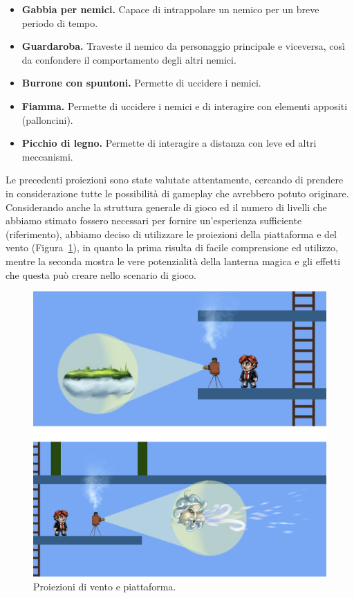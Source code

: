 \begin{itemize}
	\item \textbf{Gabbia per nemici.} Capace di intrappolare un nemico per un breve periodo di tempo.
	
	\item \textbf{Guardaroba.} Traveste il nemico da personaggio principale e viceversa, così da confondere il comportamento degli altri nemici.
	
	\item \textbf{Burrone con spuntoni.} Permette di uccidere i nemici.
	
	\item \textbf{Fiamma.} Permette di uccidere i nemici e di interagire con elementi appositi (palloncini).
	
	\item \textbf{Picchio di legno.} Permette di interagire a distanza con leve ed altri meccanismi.
\end{itemize}

Le precedenti proiezioni sono state valutate attentamente, cercando di prendere in considerazione tutte le possibilità di gameplay che avrebbero potuto originare.
Considerando anche la struttura generale di gioco ed il numero di livelli che abbiamo stimato fossero necessari per fornire un’esperienza sufficiente (riferimento), abbiamo deciso di utilizzare le proiezioni della piattaforma e del vento (Figura~\ref{fig:meccaniche_precinema_piattaforma_vento}), in quanto la prima risulta di facile comprensione ed utilizzo, mentre la seconda mostra le vere potenzialità della lanterna magica e gli effetti che questa può creare nello scenario di gioco.

\begin{figure}%
	\centering
	\includegraphics[width= 0.85\columnwidth]{images/gameDesign/18_piattaforma_vento.jpg}
	\caption{Proiezioni di vento e piattaforma.}
	\label{fig:meccaniche_precinema_piattaforma_vento}
\end{figure}

